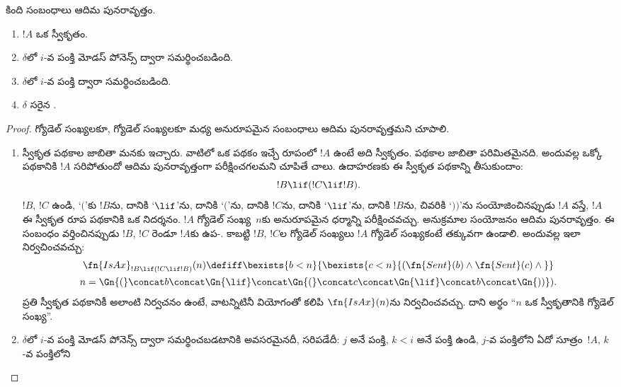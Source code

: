 \documentclass[../../../include/open-logic-section]{subfiles}
\begin{document}
\begin{prop}
కింది సంబంధాలు ఆదిమ పునరావృత్తం.
\begin{enumerate}
\item $!A$ ఒక స్వీకృతం.
\item $\delta$లో $i$-వ పంక్తి మోడస్ పోనెన్స్ ద్వారా సమర్థించబడింది.
\item $\delta$లో $i$-వ పంక్తి \QR{} ద్వారా సమర్థించబడింది.
\item $\delta$ సరైన .
\end{enumerate}
\end{prop}

\begin{proof}
 గ్యోడెల్ సంఖ్యలకూ,
 గ్యోడెల్ సంఖ్యలకూ మధ్య అనురూపమైన
సంబంధాలు ఆదిమ పునరావృత్తమని చూపాలి.
\begin{enumerate}
\item స్వీకృత పథకాల జాబితా మనకు ఇచ్చారు. వాటిలో ఒక పథకం ఇచ్చే రూపంలో
  $!A$ ఉంటే అది స్వీకృతం. పథకాల జాబితా పరిమితమైనది. అందువల్ల ఒక్కో
  పథకానికి $!A$ సరిపోతుందో ఆదిమ పునరావృత్తంగా పరీక్షించగలమని చూపితే చాలు.
  ఉదాహరణకు ఈ స్వీకృత పథకాన్ని తీసుకుందాం:
  \[
  !B\lif(!C\lif !B).
  \]
   $!B$, $!C$ ఉండి, `$($'కు $!B$ను,
  దానికి `$\lif$'ను, దానికి `$($'ను, దానికి $!C$ను, దానికి `$\lif$'ను,
  దానికి $!B$ను, చివరికి `$))$'ను సంయోజించినప్పుడు $!A$ వస్తే, $!A$ ఈ
  స్వీకృత రూప పథకానికి ఒక నిదర్శనం. $!A$ గ్యోడెల్ సంఖ్య~$n$కు అనురూపమైన
ధర్మాన్ని పరీక్షించవచ్చు. అనుక్రమాల సంయోజనం ఆదిమ పునరావృత్తం. ఈ సంబంధం
వర్తించినప్పుడు $!B$, $!C$ రెండూ $!A$కు ఉప-.
  కాబట్టి $!B$, $!C$ల గ్యోడెల్ సంఖ్యలు $!A$ గ్యోడెల్ సంఖ్యకంటే తక్కువగా
  ఉండాలి.
  అందువల్ల ఇలా నిర్వచించవచ్చు:
  \begin{multline*}
  \fn{IsAx}_{!B\lif(!C\lif !B)}(n)\defiff\bexists{b<n}{
    \bexists{c<n}{(\fn{Sent}(b)\land\fn{Sent}(c)\land{}}}\\ n=
  \Gn{(}\concat b\concat\Gn{\lif}\concat\Gn{(}\concat c\concat
  \Gn{\lif}\concat b\concat\Gn{))}).
  \end{multline*}
  ప్రతి స్వీకృత పథకానికీ అలాంటి నిర్వచనం ఉంటే, వాటన్నిటినీ వియోగంతో
  కలిపి $\fn{IsAx}(n)$ను నిర్వచించవచ్చు. దాని అర్థం ``$n$ ఒక స్వీకృతానికి
  గ్యోడెల్ సంఖ్య''.
\item $\delta$లో $i$-వ పంక్తి మోడస్ పోనెన్స్ ద్వారా సమర్థించబడటానికి
  అవసరమైనదీ, సరిపడేదీ: $j$ అనే పంక్తి, $k<i$ అనే పంక్తి ఉండి, $j$-వ పంక్తిలోని
   ఏదో సూత్రం~$!A$, $k$-వ పంక్తిలోని

\end{enumerate}
\end{proof}
\end{document}
